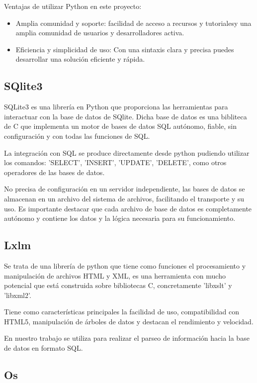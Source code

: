 \documentclass[a4paper, 12pt]{book}
\begin{document}
Ventajas de utilizar Python en este proyecto:

\begin{itemize}
    \item Amplia comunidad y soporte: facilidad de acceso a recursos y tutorialesy una amplia comunidad de usuarios y desarrolladores activa.

    \item Eficiencia y simplicidad de uso: Con una sintaxis clara y precisa puedes desarrollar una solución eficiente y rápida.
\end{itemize}

\subsection{SQlite3}

SQLite3 es una librería en Python que proporciona las herramientas para interactuar con la base de datos de SQlite. Dicha base de datos es una bibliteca de C que implementa un motor de bases de datos SQL autónomo, fiable, sin configuración y con todas las funciones de SQL.

La integración con SQL se produce directamente desde python pudiendo utilizar los comandos: 'SELECT', 'INSERT', 'UPDATE', 'DELETE', como otros operadores de las bases de datos.

No precisa de configuración en un servidor independiente, las bases de datos se almacenan en un archivo del sistema de archivos, facilitando el transporte y su uso. Es importante destacar que cada archivo de base de datos es completamente autónomo y contiene los datos y la lógica necesaria para su funcionamiento.

\subsection{Lxlm}

Se trata de una librería de python que tiene como funciones el procesamiento y manipulación de archivos HTML y XML, es una herramienta con mucho potencial que está construida sobre bibliotecas C, concretamente 'libxslt' y 'libxml2'.

Tiene como características principales la facilidad de uso, compatibilidad con HTML5, manipulación de árboles de datos y destacan el rendimiento y velocidad.

En nuestro trabajo se utiliza para realizar el parseo de información hacia la base de datos en formato SQL.

\subsection{Os}
\end{document}
